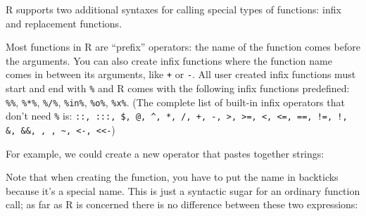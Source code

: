 
R supports two additional syntaxes for calling special types of
functions: infix and replacement functions.


Most functions in R are ``prefix'' operators: the name of the function
comes before the arguments. You can also create infix functions where
the function name comes in between its arguments, like \texttt{+} or
\texttt{-}. All user created infix functions must start and end with
\texttt{\%} and R comes with the following infix functions predefined:
\texttt{\%\%}, \texttt{\%*\%}, \texttt{\%/\%}, \texttt{\%in\%},
\texttt{\%o\%}, \texttt{\%x\%}. (The complete list of built-in infix
operators that don't need \texttt{\%} is:
\texttt{::, :::, \$, @, \^{}, *, /, +, -, \textgreater{}, \textgreater{}=, \textless{}, \textless{}=, ==, !=, !, \&, \&\&, \textbar{}, \textbar{}\textbar{}, \textasciitilde{}, \textless{}-, \textless{}\textless{}-})
  \indexc{\%\%}

For example, we could create a new operator that pastes together
strings:

\begin{Shaded}
\end{Shaded}

Note that when creating the function, you have to put the name in
backticks because it's a special name. This is just a syntactic sugar
for an ordinary function call; as far as R is concerned there is no
difference between these two expressions:

\begin{Shaded}
\end{Shaded}

